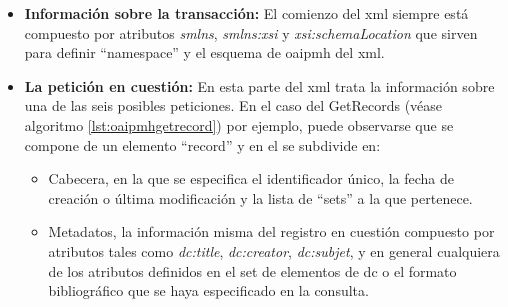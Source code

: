 \begin{itemize}
	\item \textbf{Información sobre la transacción:} El comienzo del \acrshort{xml} siempre está compuesto por atributos \textit{smlns}, \textit{smlns:xsi} y \textit{xsi:schemaLocation} que sirven para definir ``namespace'' y el esquema de \acrshort{oaipmh} del \acrshort{xml}.

	\item \textbf{La petición en cuestión:} En esta parte del \acrshort{xml} trata la información sobre una de las seis posibles peticiones. En el caso del GetRecords (véase algoritmo \ref{lst:oaipmhgetrecord}) por ejemplo, puede observarse que se compone de un elemento ``record'' y en el se subdivide en:
		\begin{itemize}
			\item Cabecera, en la que se especifica el identificador único, la fecha de creación o última modificación y la lista de ``sets'' a la que pertenece.
			\item Metadatos, la información misma del registro en cuestión compuesto por atributos tales como \textit{dc:title}, \textit{dc:creator}, \textit{dc:subjet}, y en general cualquiera de los atributos definidos en el set de elementos de \acrshort{dc}\cite{DCElements} o el formato bibliográfico que se haya especificado en la consulta.
		\end{itemize}
\end{itemize}

